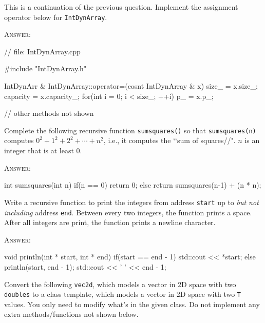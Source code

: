 \newpage
\nextq
This is a continuation of the previous question.
Implement the assignment operator below for \verb!IntDynArray!.

\textsc{Answer:}
\begin{answercode}
// file: IntDynArray.cpp

#include "IntDynArray.h"

IntDynArr & IntDynArray::operator=(cosnt IntDynArray & x)
{
    size_ = x.size_;
    capacity = x.capacity_;
    for(int i = 0; i < size_; ++i)
    {
        p_ = x.p_;
    }
}

// other methods not shown
\end{answercode}


\newpage
\nextq
Complete the following recursive function \verb!sumsquares()! so that
\verb!sumsquares(n)! computes $0^2 + 1^2 + 2^2 + \cdots + n^2$, i.e.,
    it computes the \lq\lq sum of squares//".
$n$ is an integer that is at least $0$.

\textsc{Answer:}
\begin{answercode}
int sumsquares(int n)
{
    if(n == 0)
        return 0;
    else
        return sumsquares(n-1) + (n * n);
}
\end{answercode}


\newpage
\nextq
Write a recursive function to print the integers from address
\verb!start! up to \textit{but not including} address \verb!end!.
Between every two integers, the function prints a space.
After all integers are print, the function prints a newline character.

\textsc{Answer:}
\begin{answercode}
void println(int * start, int * end)
{
    if(start == end - 1)
        std::cout << *start;
    else
    {
        println(start, end - 1);
        std::cout << ' ' << end - 1; 
    }
}
\end{answercode}

\newpage
\nextq
Convert the following \verb!vec2d!, which models a vector in 2D space with
two \verb!doubles! to a class template,
which models a vector in 2D space with two \verb!T! values.
You only need to modify what's in the given class.
Do not implement any extra methods/functions not shown below.


